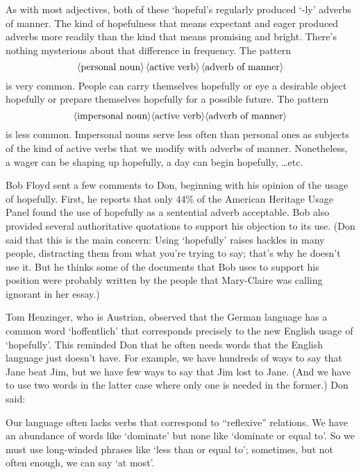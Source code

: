 \def\|{\advance\abovedisplayskip-6pt\advance\belowdisplayskip-6pt}
{\narrower\narrower\smallskip\noindent
        As with most adjectives, both of these `hopeful's regularly
        produced \hbox{`-ly'} adverbs of manner.  The kind of hopefulness
        that means expectant and eager produced adverbs more readily
        than the kind that means promising and bright.  There's nothing
        mysterious about that difference in frequency.  The pattern
$$\|\hbox{$\langle$personal noun$\rangle\,\langle$active 
verb$\rangle\,\langle$adverb of manner$\rangle$}$$
        is very common.  People can carry themselves hopefully or eye
        a desirable object hopefully or prepare themselves hopefully
        for a possible future.  The pattern
$$\|\hbox{$\langle$impersonal noun$\rangle\langle$active 
verb$\rangle\langle$adverb of manner$\rangle$}$$
        is less common.  Impersonal nouns serve less often than personal
        ones as subjects of the kind of active verbs that we modify
        with adverbs of manner.  Nonetheless, a wager can be shaping
        up hopefully, a day can begin hopefully, \dots  etc.
\smallskip}

Bob Floyd sent a few comments to Don,  beginning with his opinion of
the usage of hopefully.  First, he reports that only 44\% of the American
Heritage Usage Panel found the use of hopefully as a sentential adverb
acceptable.  Bob 
also provided several authoritative quotations to support his objection to
its use.  (Don said 
that this is the main concern: Using `hopefully' raises hackles in many
people, distracting them from what you're trying to say;  that's
why he doesn't use it. But he thinks some of the documents
 that Bob uses to support his
position were probably written by the
people that Mary-Claire was calling ignorant in her essay.)

Tom Henzinger, who is Austrian, observed that the German language
has a common word `hoffentlich' that corresponds precisely to
the new English usage of `hopefully'. This reminded
Don  that he often needs
words  that the English language just doesn't have.  For
example, we have hundreds of ways
 to say that Jane beat Jim, but we have few ways to
say that Jim lost to Jane. (And we have to use two words in the latter case where
only one is needed in the former.) Don said:

{\narrower\smallskip\noindent
    Our language often lacks verbs that correspond to ``reflexive''
    relations. We have an abundance of words like `dominate' but none like
    `dominate or equal to'.  So we must use long-winded phrases like `less 
    than or equal to'; sometimes, but not often enough, we can say `at most'.
\smallskip}

